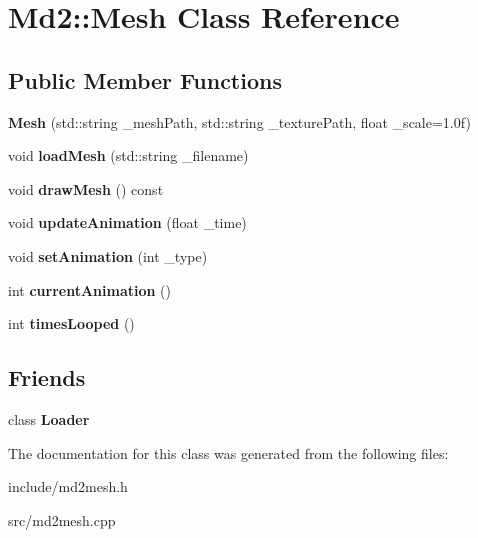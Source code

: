 \hypertarget{classMd2_1_1Mesh}{\section{Md2\-:\-:Mesh Class Reference}
\label{classMd2_1_1Mesh}
}
\subsection*{Public Member Functions}
\begin{DoxyCompactItemize}
\item 
\hypertarget{classMd2_1_1Mesh_a330321f9f74794f41ce15baa16d87ea5}{{\bfseries Mesh} (std\-::string \-\_\-mesh\-Path, std\-::string \-\_\-texture\-Path, float \-\_\-scale=1.\-0f)}\label{classMd2_1_1Mesh_a330321f9f74794f41ce15baa16d87ea5}

\item 
\hypertarget{classMd2_1_1Mesh_abe82f35c1e6aa1aeb34c80bc28110949}{void {\bfseries load\-Mesh} (std\-::string \-\_\-filename)}\label{classMd2_1_1Mesh_abe82f35c1e6aa1aeb34c80bc28110949}

\item 
\hypertarget{classMd2_1_1Mesh_a78f893fb1196cba9188b21f7122c02dd}{void {\bfseries draw\-Mesh} () const }\label{classMd2_1_1Mesh_a78f893fb1196cba9188b21f7122c02dd}

\item 
\hypertarget{classMd2_1_1Mesh_a2118cda6062c13d86f0f3bd50b7f95f8}{void {\bfseries update\-Animation} (float \-\_\-time)}\label{classMd2_1_1Mesh_a2118cda6062c13d86f0f3bd50b7f95f8}

\item 
\hypertarget{classMd2_1_1Mesh_a448e1863a00a972d8bef573fa4e21fb1}{void {\bfseries set\-Animation} (int \-\_\-type)}\label{classMd2_1_1Mesh_a448e1863a00a972d8bef573fa4e21fb1}

\item 
\hypertarget{classMd2_1_1Mesh_a6f360a26ec237c0f8b1cd68ed622f6e9}{int {\bfseries current\-Animation} ()}\label{classMd2_1_1Mesh_a6f360a26ec237c0f8b1cd68ed622f6e9}

\item 
\hypertarget{classMd2_1_1Mesh_a9edc97a9fbb8e8e624f020af620859e5}{int {\bfseries times\-Looped} ()}\label{classMd2_1_1Mesh_a9edc97a9fbb8e8e624f020af620859e5}

\end{DoxyCompactItemize}
\subsection*{Friends}
\begin{DoxyCompactItemize}
\item 
\hypertarget{classMd2_1_1Mesh_ac8e5438321e35520c4088ff6ca4116ee}{class {\bfseries Loader}}\label{classMd2_1_1Mesh_ac8e5438321e35520c4088ff6ca4116ee}

\end{DoxyCompactItemize}


The documentation for this class was generated from the following files\-:\begin{DoxyCompactItemize}
\item 
include/md2mesh.\-h\item 
src/md2mesh.\-cpp\end{DoxyCompactItemize}
